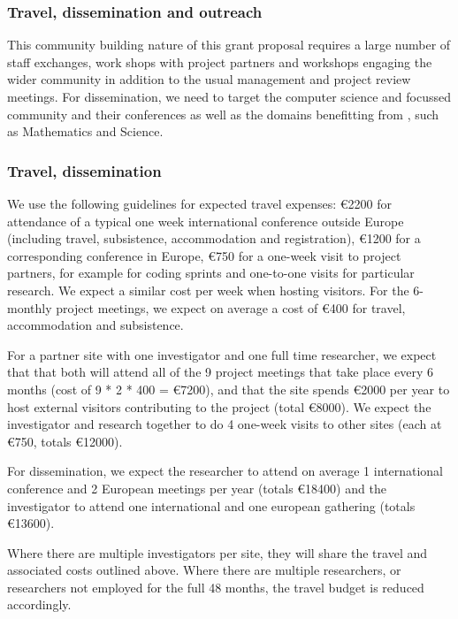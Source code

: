 
\subsubsection{Travel, dissemination and outreach}
\label{sect:budget-details}

This community building nature of this grant proposal requires a large
number of staff exchanges, work shops with project partners and
workshops engaging the wider community in addition to the usual
management and project review meetings. For dissemination, we need to
target the computer science and focussed community and their conferences
as well as the domains benefitting from \TheProject, such as
Mathematics and Science.

\subsubsection{Travel, dissemination}
\label{sect:budget-details-travel}

We use the following guidelines for expected travel expenses:
\euro{2200} for attendance of a typical one week international
conference outside Europe (including travel, subsistence,
accommodation and registration), \euro{1200} for a corresponding
conference in Europe, \euro{750} for a one-week visit to project
partners, for example for coding sprints and one-to-one visits for
particular research. We expect a similar cost per week when hosting
visitors. For the 6-monthly project meetings, we expect on average a
cost of \euro{400} for travel, accommodation and subsistence.

For a partner site with one investigator and one full time researcher,
we expect that that both will attend all of the 9 project meetings that take
place every 6 months (cost of 9 * 2 * 400 =
\euro{7200}), and that the site spends \euro{2000} per year to host
external visitors contributing to the project (total \euro{8000}). We
expect the investigator and research together to do 4 one-week visits
to other sites (each at \euro{750}, totals \euro{12000}).


For dissemination, we expect the researcher to attend on average 1
international conference and 2 European meetings per year (totals
\euro{18400}) and the investigator to attend one international and one
european gathering (totals \euro{13600}).

Where there are multiple investigators per site, they will share the
travel and associated costs outlined above. Where there are multiple
researchers, or researchers not employed for the full 48 months, the
travel budget is reduced accordingly.

